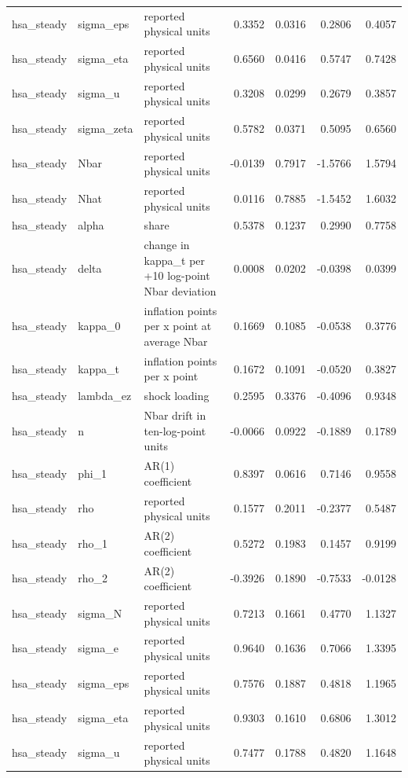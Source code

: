 \begin{tabular}{lllrrrr}
hsa\_steady & sigma\_eps & reported physical units & 0.3352 & 0.0316 & 0.2806 & 0.4057 \\
hsa\_steady & sigma\_eta & reported physical units & 0.6560 & 0.0416 & 0.5747 & 0.7428 \\
hsa\_steady & sigma\_u & reported physical units & 0.3208 & 0.0299 & 0.2679 & 0.3857 \\
hsa\_steady & sigma\_zeta & reported physical units & 0.5782 & 0.0371 & 0.5095 & 0.6560 \\
hsa\_steady & Nbar & reported physical units & -0.0139 & 0.7917 & -1.5766 & 1.5794 \\
hsa\_steady & Nhat & reported physical units & 0.0116 & 0.7885 & -1.5452 & 1.6032 \\
hsa\_steady & alpha & share & 0.5378 & 0.1237 & 0.2990 & 0.7758 \\
hsa\_steady & delta & change in kappa\_t per +10 log-point Nbar deviation & 0.0008 & 0.0202 & -0.0398 & 0.0399 \\
hsa\_steady & kappa\_0 & inflation points per x point at average Nbar & 0.1669 & 0.1085 & -0.0538 & 0.3776 \\
hsa\_steady & kappa\_t & inflation points per x point & 0.1672 & 0.1091 & -0.0520 & 0.3827 \\
hsa\_steady & lambda\_ez & shock loading & 0.2595 & 0.3376 & -0.4096 & 0.9348 \\
hsa\_steady & n & Nbar drift in ten-log-point units & -0.0066 & 0.0922 & -0.1889 & 0.1789 \\
hsa\_steady & phi\_1 & AR(1) coefficient & 0.8397 & 0.0616 & 0.7146 & 0.9558 \\
hsa\_steady & rho & reported physical units & 0.1577 & 0.2011 & -0.2377 & 0.5487 \\
hsa\_steady & rho\_1 & AR(2) coefficient & 0.5272 & 0.1983 & 0.1457 & 0.9199 \\
hsa\_steady & rho\_2 & AR(2) coefficient & -0.3926 & 0.1890 & -0.7533 & -0.0128 \\
hsa\_steady & sigma\_N & reported physical units & 0.7213 & 0.1661 & 0.4770 & 1.1327 \\
hsa\_steady & sigma\_e & reported physical units & 0.9640 & 0.1636 & 0.7066 & 1.3395 \\
hsa\_steady & sigma\_eps & reported physical units & 0.7576 & 0.1887 & 0.4818 & 1.1965 \\
hsa\_steady & sigma\_eta & reported physical units & 0.9303 & 0.1610 & 0.6806 & 1.3012 \\
hsa\_steady & sigma\_u & reported physical units & 0.7477 & 0.1788 & 0.4820 & 1.1648 \\

\end{tabular}
